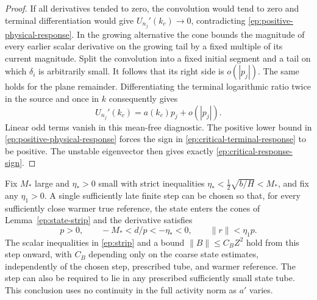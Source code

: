 \begin{proof}
If all derivatives tended to zero, the convolution would
tend to zero and terminal differentiation would give
$U_{n_j}'(k_c)\to0$, contradicting
\eqref{ep:positive-physical-response}.  In the growing
alternative the cone bounds the magnitude of every earlier
scalar derivative on the growing tail by a fixed multiple
of its current magnitude.  Split the convolution into a
fixed initial segment and a tail on which $\delta_i$ is
arbitrarily small.  It follows that its right side is
$o(|p_j|)$.  The same holds for the plane remainder.
Differentiating the terminal logarithmic ratio twice in the
source and once in $k$ consequently gives
\begin{equation}\label{ep:critical-terminal-response}
 U_{n_j}'(k_c)=a(k_c)p_j+o(|p_j|).
\end{equation}
Linear odd terms vanish in this mean-free diagnostic.
The positive lower bound in
\eqref{ep:positive-physical-response} forces the sign in
\eqref{ep:critical-terminal-response} to be positive.
The unstable eigenvector then gives exactly
\eqref{ep:critical-response-sign}.
\end{proof}

\begin{lemma}
\label{ep:parameter-continuity}
Fix $M_*$ large and $\eta_*>0$ small with strict inequalities
$\eta_*<\tfrac12\sqrt{b/H}<M_*$, and fix any $\eta_1>0$.
A single sufficiently late finite step can be chosen so
that, for every sufficiently close warmer true reference,
the state enters the cones of Lemma~\ref{ep:state-strip}
and the derivative satisfies
\[
 p>0,\qquad -M_*<d/p<-\eta_*<0,\qquad
 \|r\|<\eta_1p .
\]
The scalar inequalities in \eqref{ep:strip} and a bound
$\|B\|\le C_BZ^2$ hold from this step onward, with $C_B$ depending
only on the coarse state estimates, independently of the chosen step,
prescribed tube, and warmer reference.
The step can also be required to lie in any prescribed sufficiently
small state tube.  This conclusion uses no continuity in the full
activity norm as $a'$ varies.
\end{lemma}

